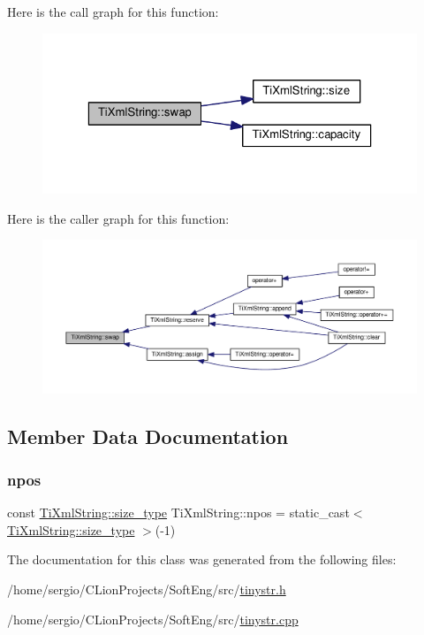 Here is the call graph for this function\+:\nopagebreak
\begin{figure}[H]
\begin{center}
\leavevmode
\includegraphics[width=323pt]{class_ti_xml_string_aa392cbc180752a79f007f4f9280c7762_cgraph}
\end{center}
\end{figure}
Here is the caller graph for this function\+:\nopagebreak
\begin{figure}[H]
\begin{center}
\leavevmode
\includegraphics[width=350pt]{class_ti_xml_string_aa392cbc180752a79f007f4f9280c7762_icgraph}
\end{center}
\end{figure}


\subsection{Member Data Documentation}
\mbox{\label{class_ti_xml_string_a8f4422d227088dc7bec96f479b275d0a}} 
\subsubsection{\texorpdfstring{npos}{npos}}
{\footnotesize\ttfamily const \hyperlink{class_ti_xml_string_abeb2c1893a04c17904f7c06546d0b971}{Ti\+Xml\+String\+::size\+\_\+type} Ti\+Xml\+String\+::npos = static\+\_\+cast$<$ \hyperlink{class_ti_xml_string_abeb2c1893a04c17904f7c06546d0b971}{Ti\+Xml\+String\+::size\+\_\+type} $>$(-\/1)\hspace{0.3cm}{\ttfamily [static]}}



The documentation for this class was generated from the following files\+:\begin{DoxyCompactItemize}
\item 
/home/sergio/\+C\+Lion\+Projects/\+Soft\+Eng/src/\hyperlink{tinystr_8h}{tinystr.\+h}\item 
/home/sergio/\+C\+Lion\+Projects/\+Soft\+Eng/src/\hyperlink{tinystr_8cpp}{tinystr.\+cpp}\end{DoxyCompactItemize}
